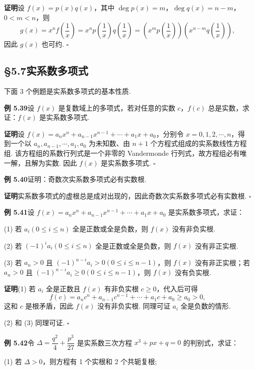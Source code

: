 \documentclass[UTF8,12pt,a4paper,fontset=fandol]{ctexart}
\begin{document}
\noindent\textbf{证明}\quad 设 $f(x)=p(x)q(x)$，其中 $\deg p(x)=m$，$\deg q(x)=n-m$，$0<m<n$，则
\[
g(x)=x^nf\left(\frac1x\right)
=x^np\left(\frac1x\right)q\left(\frac1x\right)
=\left(x^mp\left(\frac1x\right)\right)\left(x^{n-m}q\left(\frac1x\right)\right),
\]
因此 $g(x)$ 也可约. \hfill $\square$

\subsection*{§5.7\quad 实系数多项式}

下面 3 个例题是实系数多项式的基本性质.

\noindent\textbf{例 5.39}\quad 设 $f(x)$ 是复数域上的多项式，若对任意的实数 $c$，$f(c)$ 总是实数，求证：$f(x)$ 是实系数多项式.

\noindent\textbf{证明}\quad 设 $f(x)=a_nx^n+a_{n-1}x^{n-1}+\cdots+a_1x+a_0$，分别令 $x=0,1,2,\cdots,n$，得到一个以 $a_n,a_{n-1},\cdots,a_1,a_0$ 为未知数、由 $n+1$ 个方程式组成的实系数线性方程组. 该方程组的系数行列式是一个非零的 Vandermonde 行列式，故方程组必有唯一解，且解为实数. 因此 $f(x)$ 是实系数多项式. \hfill $\square$

\noindent\textbf{例 5.40}\quad 证明：奇数次实系数多项式必有实数根.

\noindent\textbf{证明}\quad 实系数多项式的虚根总是成对出现的，因此奇数次实系数多项式必有实数根. \hfill $\square$

\noindent\textbf{例 5.41}\quad 设 $f(x)=a_nx^n+a_{n-1}x^{n-1}+\cdots+a_1x+a_0$ 是实系数多项式，求证：

(1) 若 $a_i(0\le i\le n)$ 全是正数或全是负数，则 $f(x)$ 没有非负实根.

(2) 若 $(-1)^ia_i(0\le i\le n)$ 全是正数或全是负数，则 $f(x)$ 没有非正实根.

(3) 若 $a_n>0$ 且 $(-1)^{n-i}a_i>0(0\le i\le n-1)$，则 $f(x)$ 没有非正实根；若 $a_n>0$ 且 $(-1)^{n-i}a_i\ge0(0\le i\le n-1)$，则 $f(x)$ 没有负实根.

\noindent\textbf{证明}\quad (1) 若 $a_i$ 全是正数且 $f(x)$ 有非负实根 $c\ge0$，代入后可得
\[
f(c)=a_nc^n+a_{n-1}c^{n-1}+\cdots+a_1c+a_0\ge a_0>0,
\]
这和 $c$ 是根矛盾，因此 $f(x)$ 没有非负实根. 同理可证 $a_i$ 全是负数的情形.

(2) 和 (3) 同理可证. \hfill $\square$

\noindent\textbf{例 5.42}\quad 令 $\Delta=\dfrac{q^2}{4}+\dfrac{p^3}{27}$ 是实系数三次方程 $x^3+px+q=0$ 的判别式，求证：

(1) 若 $\Delta>0$，则方程有 1 个实根和 2 个共轭复根;
\end{document}
